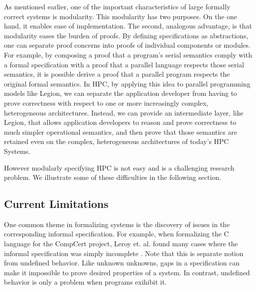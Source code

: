 \documentclass[sigconf]{acmart}
\begin{document}
As mentioned earlier, one of the important characteristics of large formally
correct systems is modularity. This modularity has two purposes. On the one
hand, it enables ease of implementation. The second, analogous advantage, is
that modularity eases the burden of proofs. By defining
specifications as abstractions, one can separate proof concerns into proofs of
individual components or modules. For
example, by composing a proof that a program's serial semantics comply with a
formal specification with a proof that a parallel language respects those
serial semantics, it is possible derive a proof that a parallel program respects the
original formal semantics. In HPC, by applying this idea to parallel
programming models like Legion, we can separate the application developer from
having to prove correctness with respect to one or more increasingly complex,
heterogeneous architectures. Instead, we can provide an intermediate layer,
like Legion, that allows application developers to reason and prove correctness
to much simpler operational semantics, and then prove that those semantics are
retained even on the complex, heterogeneous architectures of today's
HPC Systems.

However modularly specifying HPC is not easy and is a challenging research
problem. We illustrate some of these difficulties in the following section.

\subsection{Current Limitations}

One common theme in formalizing systems is the discovery of issues in the
corresponding informal specification. For example, when formalizing the C
language for the CompCert project, Leroy et. al. found many cases where the
informal specification was simply incomplete \cite{leroy2012compcert}. Note
that this is separate notion from undefined behavior. Like unknown unknowns,
gaps in a specification can make it impossible to prove desired properties of a
system.  In contrast, undefined behavior is only a problem when programs
exihibit it.
\end{document}
